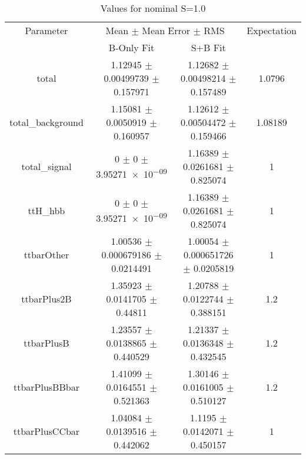 \begin{table}
\centering
\caption{Values for nominal S=1.0}
\begin{tabular}{cccc}
\toprule
Parameter & \multicolumn{2}{c}{Mean $\pm$ Mean Error $\pm$ RMS} & Expectation\\
 & B-Only Fit & S+B Fit & \\
\midrule
total & \num{1.12945} $\pm$ \num{0.00499739} $\pm$ \num{0.157971} & \num{1.12682} $\pm$ \num{0.00498214} $\pm$ \num{0.157489} & \num{1.0796}\\
total\_background & \num{1.15081} $\pm$ \num{0.0050919} $\pm$ \num{0.160957} & \num{1.12612} $\pm$ \num{0.00504472} $\pm$ \num{0.159466} & \num{1.08189}\\
total\_signal & \num{0} $\pm$ \num{0} $\pm$ \num{3.95271e-09} & \num{1.16389} $\pm$ \num{0.0261681} $\pm$ \num{0.825074} & \num{1}\\
ttH\_hbb & \num{0} $\pm$ \num{0} $\pm$ \num{3.95271e-09} & \num{1.16389} $\pm$ \num{0.0261681} $\pm$ \num{0.825074} & \num{1}\\
ttbarOther & \num{1.00536} $\pm$ \num{0.000679186} $\pm$ \num{0.0214491} & \num{1.00054} $\pm$ \num{0.000651726} $\pm$ \num{0.0205819} & \num{1}\\
ttbarPlus2B & \num{1.35923} $\pm$ \num{0.0141705} $\pm$ \num{0.44811} & \num{1.20788} $\pm$ \num{0.0122744} $\pm$ \num{0.388151} & \num{1.2}\\
ttbarPlusB & \num{1.23557} $\pm$ \num{0.0138865} $\pm$ \num{0.440529} & \num{1.21337} $\pm$ \num{0.0136348} $\pm$ \num{0.432545} & \num{1.2}\\
ttbarPlusBBbar & \num{1.41099} $\pm$ \num{0.0164551} $\pm$ \num{0.521363} & \num{1.30146} $\pm$ \num{0.0161005} $\pm$ \num{0.510127} & \num{1.2}\\
ttbarPlusCCbar & \num{1.04084} $\pm$ \num{0.0139516} $\pm$ \num{0.442062} & \num{1.1195} $\pm$ \num{0.0142071} $\pm$ \num{0.450157} & \num{1}\\
\bottomrule
\end{tabular}
\end{table}